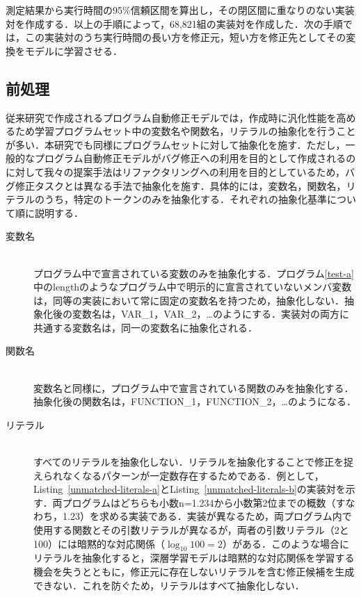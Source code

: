 \documentclass[submit,techrep,noauthor]{ipsj}
\begin{document}
測定結果から実行時間の95\%信頼区間を算出し，その閉区間に重なりのない実装対を作成する．以上の手順によって，68,821組の実装対を作成した．次の手順では，この実装対のうち実行時間の長い方を修正元，短い方を修正先としてその変換をモデルに学習させる．

\subsection{前処理}
従来研究で作成されるプログラム自動修正モデルでは，作成時に汎化性能を高めるため学習プログラムセット中の変数名や関数名，リテラルの抽象化を行うことが多い．本研究でも同様にプログラムセットに対して抽象化を施す．ただし，一般的なプログラム自動修正モデルがバグ修正への利用を目的として作成されるのに対して我々の提案手法はリファクタリングへの利用を目的としているため，バグ修正タスクとは異なる手法で抽象化を施す．具体的には，変数名，関数名，リテラルのうち，特定のトークンのみを抽象化する．それぞれの抽象化基準について順に説明する．

\begin{description}

\item[変数名]\mbox{}\\
プログラム中で宣言されている変数のみを抽象化する．プログラム\ref{test-a}中のlengthのようなプログラム中で明示的に宣言されていないメンバ変数は，同等の実装において常に固定の変数名を持つため，抽象化しない．抽象化後の変数名は，VAR\_1，VAR\_2，…のようにする．実装対の両方に共通する変数名は，同一の変数名に抽象化される．

\item[関数名]\mbox{}\\
変数名と同様に，プログラム中で宣言されている関数のみを抽象化する．抽象化後の関数名は，FUNCTION\_1，FUNCTION\_2，…のようになる．

\item[リテラル]\mbox{}\\
すべてのリテラルを抽象化しない．リテラルを抽象化することで修正を捉えられなくなるパターンが一定数存在するためである．例として，Listing~\ref{unmatched-literals-a}とListing~\ref{unmatched-literals-b}の実装対を示す．両プログラムはどちらも小数n=1.234から小数第2位までの概数（すなわち，1.23）を求める実装である．実装が異なるため，両プログラム内で使用する関数とその引数リテラルが異なるが，両者の引数リテラル（2と100）には暗黙的な対応関係（\begin{math}\log_{10} 100=2\end{math}）がある．このような場合にリテラルを抽象化すると，深層学習モデルは暗黙的な対応関係を学習する機会を失うとともに，修正元に存在しないリテラルを含む修正候補を生成できない．これを防ぐため，リテラルはすべて抽象化しない．

\end{description}
\end{document}
